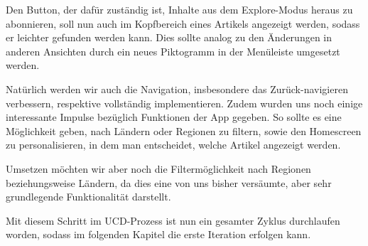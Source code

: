 Den Button, der dafür zuständig ist, Inhalte aus dem Explore-Modus heraus zu abonnieren, soll nun auch im Kopfbereich eines Artikels angezeigt werden, sodass er leichter gefunden werden kann. Dies sollte analog zu den Änderungen in anderen Ansichten durch ein neues Piktogramm in der Menüleiste umgesetzt werden.

Natürlich werden wir auch die Navigation, insbesondere das Zurück-navigieren verbessern, respektive vollständig implementieren.
Zudem wurden uns noch einige interessante Impulse bezüglich Funktionen der App gegeben. So sollte es eine Möglichkeit geben, nach Ländern oder Regionen zu filtern, sowie den Homescreen zu personalisieren, in dem man entscheidet, welche Artikel angezeigt werden.

Umsetzen möchten wir aber noch die Filtermöglichkeit nach Regionen beziehungsweise Ländern, da dies eine von uns bisher versäumte, aber sehr grundlegende Funktionalität darstellt.

Mit diesem Schritt im UCD-Prozess ist nun ein gesamter Zyklus durchlaufen worden, sodass im folgenden Kapitel die erste Iteration erfolgen kann.
